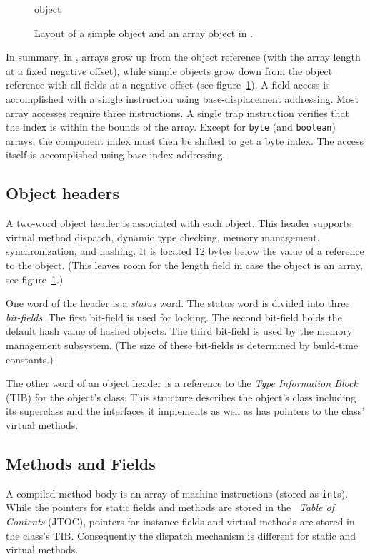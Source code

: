 \begin{figure}[htb]
\begin{gif}{object}
\vbox{
\hbox{}
}\hfil
\end{gif}
\caption{Layout of a simple object and an array object in \jp.}
\label{fig:objects}
\end{figure}

In summary, in \jp, arrays grow up from the object reference (with the
array length at a fixed negative offset), while simple objects grow
down from the object reference with all fields at a negative offset
(see figure~\ref{fig:objects}).  A field access is accomplished with a
single instruction using base-displacement addressing.  Most array
accesses require three instructions.  A single trap instruction
verifies that the index is within the bounds of the array.  Except for
{\tt byte} (and {\tt boolean}) arrays, the component index must then
be shifted to get a byte index.  The access itself is accomplished
using base-index addressing.

\subsection{Object headers} \label{sssec:headers}
A two-word object header is associated with each object.  This header
supports virtual method dispatch, dynamic type checking, memory
management, synchronization, and hashing.  It is located $12$ bytes
below the value of a reference to the object.  (This leaves room for
the length field in case the object is an array, see
figure~\ref{fig:objects}.)

One word of the header is a {\em status} word.  The status word is
divided into three {\em bit-fields}.  The first bit-field is used for
locking.  The second bit-field holds
the default hash value of hashed objects.  The third bit-field is used
by the memory management subsystem.  (The size of these bit-fields is
determined by build-time constants.)

The other word of an object header is a reference to the {\em Type
Information Block} (TIB) for the object's class. This structure describes
the object's class including its superclass and the interfaces it implements
as well as has pointers to the class' virtual methods.

\subsection{Methods and Fields}\label{sssec:methods}
A compiled method body is an array of machine instructions (stored as
{\tt int}s). 
While the pointers for static fields and methods are stored in the 
{\em \jp\ Table of Contents} (JTOC),
pointers for instance fields and virtual methods are stored in the class's TIB.
Consequently the dispatch mechanism is different for static and virtual 
methods.

